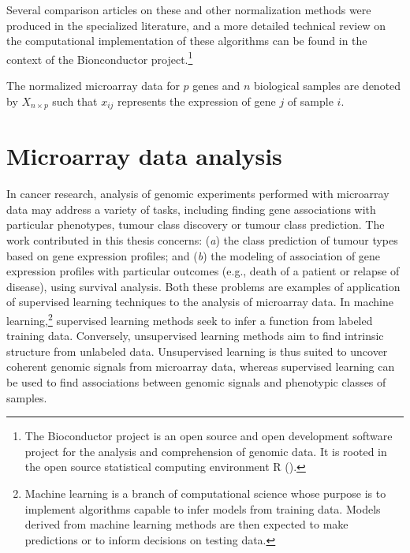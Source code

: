 Several comparison articles on these and other normalization methods were
produced in the specialized
literature,\cite{ploner_correlation_2005,bolstad_comparison_2003,harr_comparison_2006}
and a more detailed technical review on the computational implementation of
these algorithms can be found in the context of the Bionconductor
project.\footnote{The Bioconductor project is an open source and open
  development software project for the analysis and comprehension of genomic
  data.  It is rooted in the open source statistical computing environment
  \textsf{R} (\citealp{gentleman_bioinformatics_2006}).}

\medskip

The normalized microarray data for $p$ genes and $n$ biological samples are
denoted by $X_{n \times p}$ such that $x_{ij}$ represents the expression of gene
$j$ of sample $i$.

\section{Microarray data analysis}
\label{sec:microarray-methods-data-analysis}


In cancer research, analysis of genomic experiments performed with
 microarray data may address a variety of tasks, including
finding gene associations with particular phenotypes, tumour class discovery or
tumour class prediction.  The work contributed in this thesis concerns:
(\emph{a}) the class prediction of tumour types based on gene expression
profiles; and (\emph{b}) the modeling of association of gene expression profiles
with particular outcomes (e.g., death of a patient or relapse of disease), using
survival analysis.  Both these problems are examples of application of
supervised learning techniques to the analysis of microarray data.  In machine
learning,\footnote{Machine learning is a branch of computational science whose
  purpose is to implement algorithms capable to infer models from training data.
  Models derived from machine learning methods are then expected to make
  predictions or to inform decisions on testing data.} supervised learning
methods seek to infer a function from labeled training data.  Conversely,
unsupervised learning methods aim to find intrinsic structure from unlabeled
data.\cite{webb_statistical_2003} Unsupervised learning is thus suited to
uncover coherent genomic signals from microarray data, whereas supervised
learning can be used to find associations between genomic signals and phenotypic
classes of samples.

